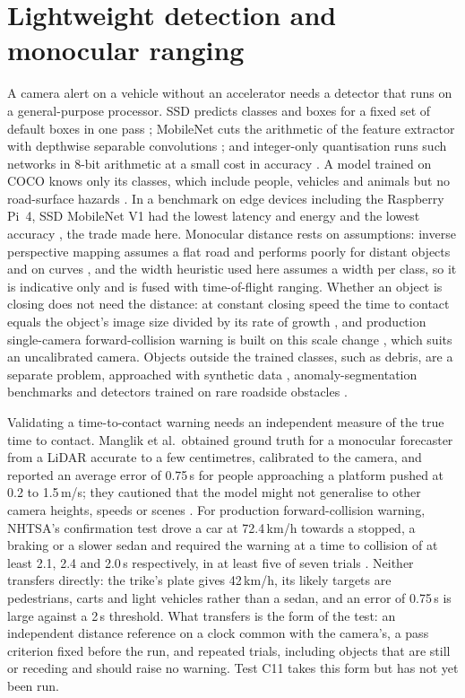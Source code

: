 \section{Lightweight detection and monocular ranging}
\label{sec:lit-detection}

A camera alert on a vehicle without an accelerator needs a detector that runs on a general-purpose processor. SSD predicts classes and boxes for a fixed set of default boxes in one pass \cite{liu2016ssd}; MobileNet cuts the arithmetic of the feature extractor with depthwise separable convolutions \cite{howard2017mobilenets}; and integer-only quantisation runs such networks in 8-bit arithmetic at a small cost in accuracy \cite{jacob2018quantization}. A model trained on COCO knows only its classes, which include people, vehicles and animals but no road-surface hazards \cite{lin2014coco}. In a benchmark on edge devices including the Raspberry Pi~4, SSD MobileNet V1 had the lowest latency and energy and the lowest accuracy \cite{alqahtani2024edge}, the trade made here. Monocular distance rests on assumptions: inverse perspective mapping assumes a flat road and performs poorly for distant objects and on curves \cite{zhu2019distance}, and the width heuristic used here assumes a width per class, so it is indicative only and is fused with time-of-flight ranging. Whether an object is closing does not need the distance: at constant closing speed the time to contact equals the object's image size divided by its rate of growth \cite{lee1976tau}, and production single-camera forward-collision warning is built on this scale change \cite{dagan2004fcw}, which suits an uncalibrated camera. Objects outside the trained classes, such as debris, are a separate problem, approached with synthetic data \cite{choe2023hazardnet}, anomaly-segmentation benchmarks \cite{chan2021segmentmeifyoucan} and detectors trained on rare roadside obstacles \cite{tanveer2026yolov8n}.

Validating a time-to-contact warning needs an independent measure of the true time to contact. Manglik et al.\ obtained ground truth for a monocular forecaster from a LiDAR accurate to a few centimetres, calibrated to the camera, and reported an average error of 0.75\,s for people approaching a platform pushed at 0.2 to 1.5\,m/s; they cautioned that the model might not generalise to other camera heights, speeds or scenes \cite{manglik2019}. For production forward-collision warning, NHTSA's confirmation test drove a car at 72.4\,km/h towards a stopped, a braking or a slower sedan and required the warning at a time to collision of at least 2.1, 2.4 and 2.0\,s respectively, in at least five of seven trials \cite{lenkeit2012fcw}. Neither transfers directly: the trike's plate gives 42\,km/h, its likely targets are pedestrians, carts and light vehicles rather than a sedan, and an error of 0.75\,s is large against a 2\,s threshold. What transfers is the form of the test: an independent distance reference on a clock common with the camera's, a pass criterion fixed before the run, and repeated trials, including objects that are still or receding and should raise no warning. Test C11 takes this form but has not yet been run.


